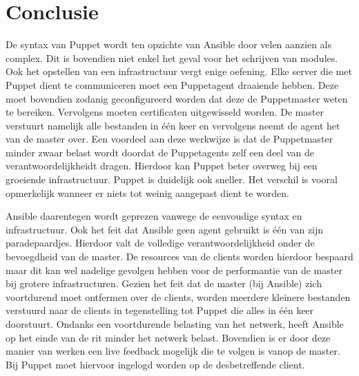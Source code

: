 
\chapter{Conclusie}
\label{ch:conclusie}

 De syntax van Puppet  wordt ten opzichte van Ansible door velen aanzien als complex. Dit is bovendien niet enkel het geval voor het schrijven van modules. Ook het opstellen van een infrastructuur vergt enige oefening. Elke server die met Puppet dient te communiceren moet een Puppetagent draaiende hebben. Deze moet bovendien zodanig geconfigureerd worden dat deze de Puppetmaster weten te bereiken. Vervolgens moeten certificaten uitgewisseld worden. De master verstuurt namelijk alle bestanden in \'e\'en keer en vervolgens neemt de agent het van de master over. Een voordeel aan deze werkwijze is dat de Puppetmaster minder zwaar belast wordt doordat de Puppetagents zelf een deel van de verantwoordelijkheidt dragen. Hierdoor kan Puppet beter overweg bij een groeiende infrastructuur. Puppet is duidelijk ook sneller. Het verschil is vooral opmerkelijk wanneer er niets tot weinig aangepast dient te worden. 

Ansible daarentegen wordt geprezen vanwege de eenvoudige syntax en infrastructuur. Ook het feit dat Ansible geen agent gebruikt is \'e\'en van zijn paradepaardjes. Hierdoor valt de volledige verantwoordelijkheid onder de bevoegdheid van de master. De resources van de clients worden hierdoor bespaard maar dit kan wel nadelige gevolgen hebben voor de performantie van de master bij grotere infrastructuren. Gezien het feit dat de master (bij Ansible) zich voortdurend moet ontfermen over de clients, worden meerdere kleinere bestanden verstuurd naar de clients in tegenstelling tot Puppet die alles in \'e\'en keer doorstuurt. Ondanks een voortdurende belasting van het netwerk, heeft Ansible op het einde van de rit minder het netwerk belast. Bovendien is er door deze manier van werken een live feedback mogelijk die te volgen is vanop de master. Bij Puppet moet hiervoor ingelogd worden op de desbetreffende client.




